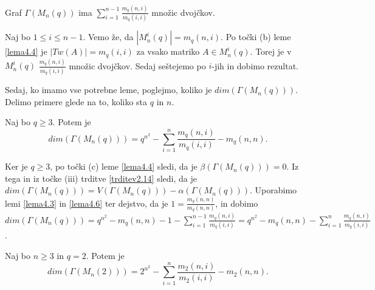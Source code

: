 \documentclass[mat1, tisk]{fmfdelo}
\begin{document}
%
\begin{lema}\label{lema4.6}
  Graf $\Gamma(M_n(q))$ ima $\sum\limits_{i=1}^{n-1} \frac{m_q(n,i)}{m_q(i,i)}$ množic dvojčkov.
\end{lema}
\begin{dokaz}
  Naj bo $1 \leq i \leq n-1$. Vemo že, da $|{M}_n^i(q)| = m_q(n,i)$. Po točki (b) 
  leme \ref{lema4.4} je $|Tw(A)| = m_q(i,i)$ za vsako matriko $A \in {M}_n^i(q)$. 
  Torej je v ${M}_n^i(q)$ $\frac{m_q(n,i)}{m_q(i,i)}$ množic dvojčkov. Sedaj seštejemo 
  po $i$-jih in dobimo rezultat.
\end{dokaz}
%
Sedaj, ko imamo vse potrebne leme, poglejmo, koliko je $dim(\Gamma(M_n(q)))$. Delimo 
primere glede na to, koliko sta $q$ in $n$. 
%
\begin{izrek}
  Naj bo $q \geq 3$. Potem je 
  \begin{equation*}
    dim(\Gamma(M_n(q))) = q^{n^2} - \sum\limits_{i=1}^{n}\frac{m_q(n,i)}{m_q(i,i)} - m_q(n,n).
  \end{equation*}
\end{izrek}
\begin{dokaz}
  Ker je $q \geq 3$, po točki (c) leme \ref{lema4.4} sledi, da je $\beta(\Gamma(M_n(q))) = 0$. 
  Iz tega in iz točke (iii) trditve \ref{trditev2.14} sledi, da je 
  $dim(\Gamma(M_n(q))) = V(\Gamma(M_n(q))) - \alpha(\Gamma(M_n(q)))$. Uporabimo lemi \ref{lema4.3} in \ref{lema4.6} ter dejstvo, da je 
  $1 = \frac{m_q(n,n)}{m_q(n,n)}$, in dobimo 
  $dim(\Gamma(M_n(q))) = q^{n^2} - m_q(n,n) - 1 - \sum\limits_{i=1}^{n-1} \frac{m_q(n,i)}{m_q(i,i)} = q^{n^2} - m_q(n,n) - \sum\limits_{i=1}^{n} \frac{m_q(n,i)}{m_q(i,i)} $.
\end{dokaz}
%
\begin{izrek}
  Naj bo $n \geq 3$ in $q = 2$. Potem je 
  \begin{equation*}
    dim(\Gamma(M_n(2))) = 2^{n^2} - \sum\limits_{i=1}^{n}\frac{m_2(n,i)}{m_2(i,i)} - m_2(n,n).
  \end{equation*}
\end{izrek}
\end{document}

